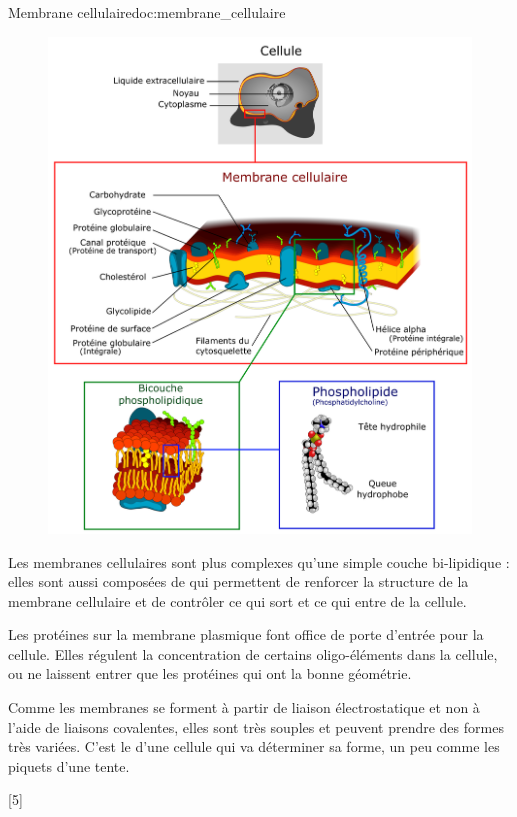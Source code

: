 \begin{doc}{Membrane cellulaire}{doc:membrane_cellulaire}
  \begin{figure}
    \centering
    \vspace*{-36pt}
    \includegraphics[width=1\linewidth]{images/proteines/cellule_membrane_lipide.png}
  \end{figure}
  Les membranes cellulaires sont plus complexes qu'une simple couche bi-lipidique : elles sont aussi composées de  qui permettent de renforcer la structure de la membrane cellulaire et de contrôler ce qui sort et ce qui entre de la cellule.
  \smallskip

  Les protéines sur la membrane plasmique font office de porte d'entrée pour la cellule. 
  Elles régulent la concentration de certains oligo-éléments dans la cellule, ou ne laissent entrer que les protéines qui ont la bonne géométrie.

  Comme les membranes se forment à partir de liaison électrostatique et non à l'aide de liaisons covalentes, elles sont très souples et peuvent prendre des formes très variées. 
  C'est le  d'une cellule qui va déterminer sa forme, un peu comme les piquets d'une tente.
  
  \phantom{b}
\end{doc}

[5]
